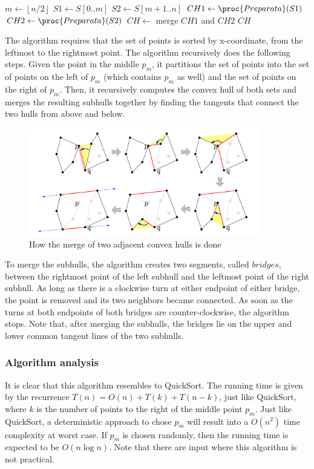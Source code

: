 \documentclass{article}
\begin{document}
\begin{codebox}
\li $m \gets \left\lfloor n / 2 \right\rfloor$
\li $S1 \gets S[0..m]$
\li $S2 \gets S[m+1..n]$ 
\li $CH1 \gets \proc{Preparata}(S1)$
\li $CH2 \gets \proc{Preparata}(S2)$
\li $CH \gets $ merge $CH1$ and $CH2$
\li \Return $CH$
\end{codebox}

The algorithm requires that the set of points is sorted by x-coordinate, from the leftmost to the rightmost point. The algorithm recursively does the following steps. Given the point in the middle $p_m$, it partitions the set of points into the set of points on the left of $p_m$ (which contains $p_m$ as well) and the set of points on the right of $p_m$. Then, it recursively computes the convex hull of both sets and merges the resulting subhulls together by finding the tangents that connect the two hulls from above and below.

\begin{figure}[h]
\centering
\includegraphics[width=0.9\textwidth]{preparata/preparata_visual_merge.png}
\caption{\label{fig:preparata_visual_merge}How the merge of two adjacent convex hulls is done \cite{jeffe}}
\end{figure}

To merge the subhulls, the algorithm creates two segments, called $bridges$, between the rightmost point of the left subhull and the leftmost point of the right subhull. As long as there is a clockwise turn at either endpoint of either bridge, the point is removed and its two neighbors became connected. As soon as the turns at both endpoints of both bridges are counter-clockwise, the algorithm stops. Note that, after merging the subhulls, the bridges lie on the upper and lower common tangent lines of the two subhulls.

\subsubsection*{Algorithm analysis}
It is clear that this algorithm resembles to QuickSort. The running time is given by the recurrence $T(n) = O(n) + T(k) + T(n-k)$, just like QuickSort, where $k$ is the number of points to the right of the middle point $p_m$. Just like QuickSort, a deterministic approach to chose $p_m$ will result into a $O(n^2)$ time complexity at worst case. If $p_m$ is chosen randomly, then the running time is expected to be $O(n\log{n})$. Note that there are input where this algorithm is not practical.
\end{document}
